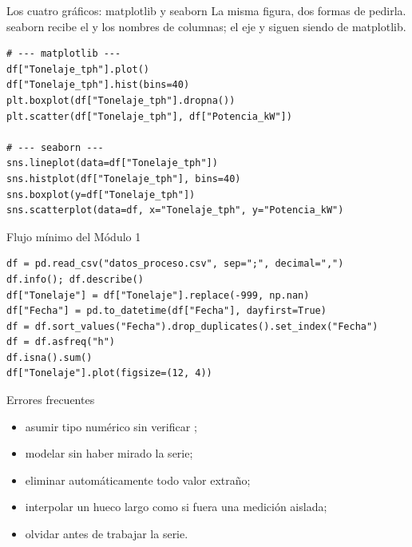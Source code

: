 \begin{frame}[fragile]{Los cuatro gráficos: matplotlib y seaborn}
La misma figura, dos formas de pedirla. seaborn recibe el  y los
nombres de columnas; el eje y  siguen siendo de matplotlib.
\begin{lstlisting}
# --- matplotlib ---
df["Tonelaje_tph"].plot()
df["Tonelaje_tph"].hist(bins=40)
plt.boxplot(df["Tonelaje_tph"].dropna())
plt.scatter(df["Tonelaje_tph"], df["Potencia_kW"])

# --- seaborn ---
sns.lineplot(data=df["Tonelaje_tph"])
sns.histplot(df["Tonelaje_tph"], bins=40)
sns.boxplot(y=df["Tonelaje_tph"])
sns.scatterplot(data=df, x="Tonelaje_tph", y="Potencia_kW")
\end{lstlisting}
\end{frame}

\begin{frame}[fragile]{Flujo mínimo del Módulo 1}
\begin{lstlisting}
df = pd.read_csv("datos_proceso.csv", sep=";", decimal=",")
df.info(); df.describe()
df["Tonelaje"] = df["Tonelaje"].replace(-999, np.nan)
df["Fecha"] = pd.to_datetime(df["Fecha"], dayfirst=True)
df = df.sort_values("Fecha").drop_duplicates().set_index("Fecha")
df = df.asfreq("h")
df.isna().sum()
df["Tonelaje"].plot(figsize=(12, 4))
\end{lstlisting}
\end{frame}

\begin{frame}{Errores frecuentes}
\begin{itemize}
  \item asumir tipo numérico sin verificar ;
  \item modelar sin haber mirado la serie;
  \item eliminar automáticamente todo valor extraño;
  \item interpolar un hueco largo como si fuera una medición aislada;
  \item olvidar  antes de trabajar la serie.
\end{itemize}
\end{frame}

